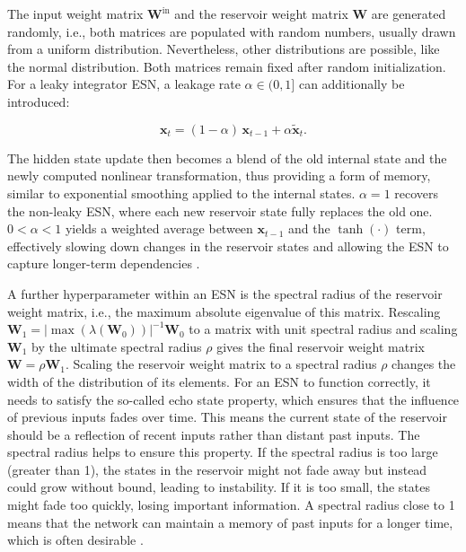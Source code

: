 The input weight matrix \(\mathbf{W}^{\mathrm{in}}\) and the reservoir weight matrix \(\mathbf{W}\) are generated randomly, i.e., both matrices are populated with random numbers, usually drawn from a uniform distribution. Nevertheless, other distributions are possible, like the normal distribution. Both matrices remain fixed after random initialization. For a leaky integrator ESN, a leakage rate \(\alpha \in (0,1]\) can additionally be introduced:

\begin{equation}
\mathbf{x}_t = (1 - \alpha)\,\mathbf{x}_{t-1} + \alpha \tilde{\mathbf{x}}_t.
\label{eq:leaky-reservoir}
\end{equation}

The hidden state update then becomes a blend of the old internal state and the newly computed nonlinear transformation, thus providing a form of memory, similar to exponential smoothing applied to the internal states. \(\alpha = 1\) recovers the non-leaky ESN, where each new reservoir state fully replaces the old one. \(0 < \alpha < 1\) yields a weighted average between \(\mathbf{x}_{t-1}\) and the \(\tanh(\cdot)\) term, effectively slowing down changes in the reservoir states and allowing the ESN to capture longer-term dependencies \citep{Lukosevicius2012}.

A further hyperparameter within an ESN is the spectral radius of the reservoir weight matrix, i.e., the maximum absolute eigenvalue of this matrix. Rescaling \(\mathbf{W}_1 = {|\max(\lambda (\mathbf{W}_0))|}^{-1} \mathbf{W}_0\) to a matrix with unit spectral radius and scaling \(\mathbf{W}_1\) by the ultimate spectral radius \(\rho\) gives the final reservoir weight matrix \(\mathbf{W} = \rho \mathbf{W}_1\). Scaling the reservoir weight matrix to a spectral radius \(\rho\) changes the width of the distribution of its elements. For an ESN to function correctly, it needs to satisfy the so-called echo state property, which ensures that the influence of previous inputs fades over time. This means the current state of the reservoir should be a reflection of recent inputs rather than distant past inputs. The spectral radius helps to ensure this property. If the spectral radius is too large (greater than 1), the states in the reservoir might not fade away but instead could grow without bound, leading to instability. If it is too small, the states might fade too quickly, losing important information. A spectral radius close to 1 means that the network can maintain a memory of past inputs for a longer time, which is often desirable \citep{Lukosevicius2012}.

